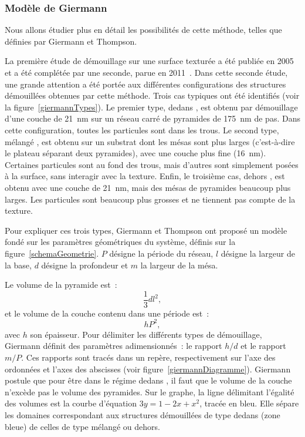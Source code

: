 		\subsubsection{Modèle de Giermann}
Nous allons étudier plus en détail les possibilités de cette méthode, telles que définies par Giermann et Thompson.\par 
La première étude de démouillage sur une surface texturée a été publiée en 2005~\cite{giermann2005solid} et a été complétée par une seconde, parue en 2011~\cite{giermann2011requirements}. Dans cette seconde étude, une grande attention a été portée aux différentes configurations des structures démouillées obtenues par cette méthode. Trois cas typiques ont été identifiés (voir la figure~\ref{giermannTypes}). Le premier type, \og dedans \fg, est obtenu par démouillage d'une couche de 21~nm sur un réseau carré de pyramides de 175~nm de pas. Dans cette configuration, toutes les particules sont dans les trous. Le second type, \og mélangé \fg, est obtenu sur un substrat dont les mésas sont plus larges (c'est-à-dire le plateau séparant deux pyramides), avec une couche plus fine (16~nm). Certaines particules sont au fond des trous, mais d'autres sont simplement posées à la surface, sans interagir avec la texture. Enfin, le troisième cas, \og dehors \fg, est obtenu avec une couche de 21~nm, mais des mésas de pyramides beaucoup plus larges. Les particules sont beaucoup plus grosses et ne tiennent pas compte de la texture.\par 
Pour expliquer ces trois types, Giermann et Thompson ont proposé un modèle fondé sur les paramètres géométriques du système, définis sur la figure~\ref{schemaGeometrie}. $P$ désigne la période du réseau, $l$ désigne la largeur de la base, $d$ désigne la profondeur et $m$ la largeur de la mésa.\par 
Le volume de la pyramide est~:
\begin{equation}
\dfrac{1}{3}dl^2,
\end{equation}
et le volume de la couche contenu dans une période est~:
\begin{equation}
hP^2,
\end{equation}
avec $h$ son épaisseur. Pour délimiter les différents types de démouillage, Giermann définit des paramètres adimensionnés~: le rapport $h/d$ et le rapport $m/P$. Ces rapports sont tracés dans un repère, respectivement sur l'axe des ordonnées et l'axes des abscisses (voir figure~\ref{giermannDiagramme}). Giermann postule que pour être dans le régime \og dedans \fg, il faut que le volume de la couche n'excède pas le volume des pyramides. Sur le graphe, la ligne délimitant l'égalité des volumes est la courbe d'équation $3y = 1 - 2x + x^2$, tracée en bleu. Elle sépare les domaines correspondant aux structures démouillées de type \og dedans\fg{} (zone bleue) de celles de type \og mélangé\fg{} ou \og dehors\fg.\par 
